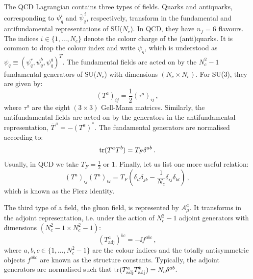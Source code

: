 \documentclass[main.tex]{subfiles}
\begin{document}
The QCD Lagrangian contains three types of fields. Quarks and antiquarks, corresponding to $\psi_q^i$ and $\overline{\psi}_q^{\,i}$, respectively, transform in the fundamental and antifundamental representations of SU($N_c$). In QCD, they have $n_f = 6$ flavours. The indices $i \in \{1,\ldots,N_c\}$ denote the colour charge of the (anti)quarks. It is common to drop the colour index and write $\psi_q$, which is understood as $\psi_q \equiv \left(\psi_q^r, \psi_q^b, \psi_q^g \right)^T$. The fundamental fields are acted on by the $N_c^2-1$ fundamental generators of SU($N_c$) with dimensions $(N_c \times N_c)$. For SU(3), they are given by:
\begin{equation}
    (T^a)_{ij} = \frac{1}{2} (\tau^a)_{ij}\,,
\end{equation}
where $\tau^a$ are the eight $(3 \times 3)$ Gell-Mann matrices. Similarly, the antifundamental fields are acted on by the generators in the antifundamental representation, $\overline{T}^{\,a} = -\left(T^a\right)^\ast$. The fundamental generators are normalised according to:
\begin{equation}
    \operatorname{\rm tr} (T^aT^b) = T_F \delta^{ab}\,.
\end{equation}
Usually, in QCD we take $T_F = \frac{1}{2}$ or $1$. Finally, let us list one more useful relation:
\begin{equation} \label{eq:fierzcolour}
    (T^a)_{ij} (T^a)_{kl} = T_F \left( \delta_{il} \delta_{jk} - \frac{1}{N_c} \delta_{ij} \delta_{kl} \right)\,,
\end{equation}
which is known as the Fierz identity.

The third type of a field, the gluon field, is represented by $A^a_\mu$. It transforms in the adjoint representation, i.e. under the action of $N_c^2-1$ adjoint generators with dimensions $(N_c^2-1 \times  N_c^2-1)$:
\begin{equation}
\left(T_\text{adj}^a\right)^{bc} = -\ii f^{abc}\,,
\end{equation}
where $a,b,c \in \{1, \ldots, N_c^2-1\}$ are the colour indices and the totally antisymmetric objects $f^{abc}$ are known as the structure constants. Typically, the adjoint generators are normalised such that $\operatorname{\rm tr} (T_\text{adj}^aT_\text{adj}^b) = N_c \delta^{ab}$. 
\end{document}
